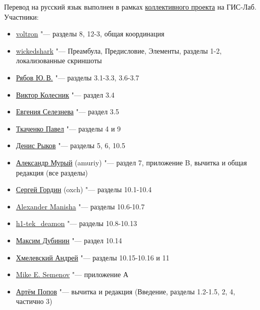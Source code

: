 Перевод на русский язык выполнен в рамках
\href{http://gis-lab.info/docs/qgis/manual15.html}{коллективного проекта}
на ГИС-Лаб. Участники:
\begin{itemize}[label=--]
\item \href{http://gis-lab.info/forum/memberlist.php?mode=viewprofile&u=5325}{voltron}
"--- разделы 8, 12-3, общая координация
\item \href{http://gis-lab.info/forum/memberlist.php?mode=viewprofile&u=7967}{wickedshark}
"--- Преамбула, Предисловие, Элементы, разделы 1-2, локализованные скриншоты
\item \href{http://gis-lab.info/forum/memberlist.php?mode=viewprofile&u=7619}{Рябов Ю.\,В.}
"--- разделы 3.1-3.3, 3.6-3.7
\item \href{http://gis-lab.info/forum/memberlist.php?mode=viewprofile&u=9954}{Виктор Колесник}
"--- раздел 3.4
\item \href{http://gis-lab.info/forum/memberlist.php?mode=viewprofile&u=7392}{Евгения Селезнева}
"--- раздел 3.5
\item \href{http://gis-lab.info/forum/memberlist.php?mode=viewprofile&u=8193}{Ткаченко Павел}
"--- разделы 4 и 9
\item \href{http://gis-lab.info/forum/memberlist.php?mode=viewprofile&u=6901}{Денис Рыков}
"--- разделы 5, 6, 10.5
\item \href{http://gis-lab.info/forum/memberlist.php?mode=viewprofile&u=8430}{Александр Мурый} (amuriy)
"--- раздел 7, приложение B, вычитка и общая редакция (все разделы)
\item \href{http://gis-lab.info/forum/memberlist.php?mode=viewprofile&u=9129}{Сергей Гордин} (oxch)
"--- разделы 10.1-10.4
\item \href{http://gis-lab.info/forum/memberlist.php?mode=viewprofile&u=1394}{Alexander Manisha}
"--- разделы 10.6-10.7
\item \href{http://gis-lab.info/forum/memberlist.php?mode=viewprofile&u=9850}{h1-tek\_deamon}
"--- разделы 10.8-10.13
\item \href{http://gis-lab.info/forum/memberlist.php?mode=viewprofile&u=2}{Максим Дубинин}
"--- раздел 10.14
\item \href{http://gis-lab.info/forum/memberlist.php?mode=viewprofile&u=9719}{Хмелевский Андрей}
"--- разделы 10.15-10.16 и 11
\item \href{http://gis-lab.info/forum/memberlist.php?mode=viewprofile&u=9876}{Mike E. Semenov}
"--- приложение А
\item \href{http://gis-lab.info/forum/memberlist.php?mode=viewprofile&u=7246}{Артём Попов}
"--- вычитка и редакция (Введение, разделы 1.2-1.5, 2, 4, частично 3)
\end{itemize}

